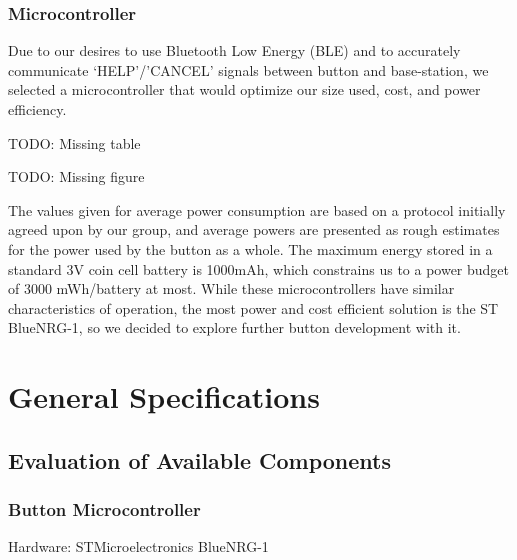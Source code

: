 \documentclass[journal]{IEEEtran}
\begin{document}
\subsubsection{Microcontroller}
Due to our desires to use Bluetooth Low Energy (BLE) and to accurately communicate ‘HELP’/’CANCEL’ signals between button and base-station, we selected a microcontroller that would optimize our size used, cost, and power efficiency.

TODO: Missing table

TODO: Missing figure

The values given for average power consumption are based on a protocol initially agreed upon by our group, and average powers are presented as rough estimates for the power used by the button as a whole.  The maximum energy stored in a standard 3V coin cell battery is 1000mAh, which constrains us to a power budget of 3000 mWh/battery at most.  While these microcontrollers have similar characteristics of operation, the most power and cost efficient solution is the ST BlueNRG-1, so we decided to explore further button development with it.

\section{General Specifications}

\subsection{Evaluation of Available Components}

\subsubsection{Button Microcontroller}

Hardware: STMicroelectronics BlueNRG-1
\end{document}
